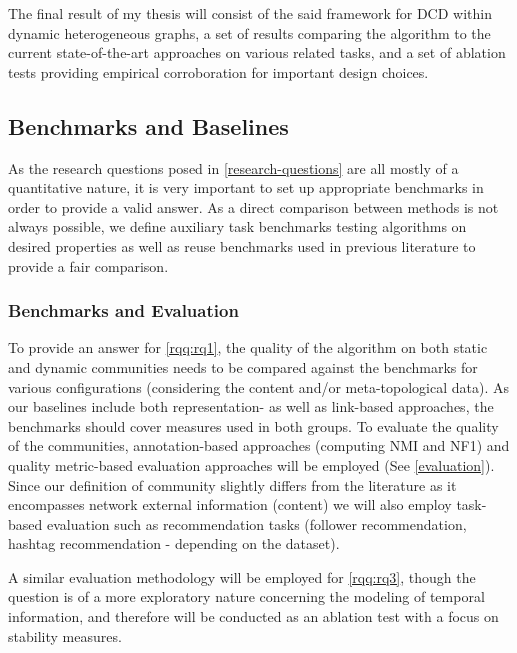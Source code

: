 \documentclass[
acmsmall,
nonacm,
screen,
acmthm]{acmart}
\begin{document}
The final result of my thesis will consist of the said framework for DCD
within dynamic heterogeneous graphs, a set of results comparing the
algorithm to the current state-of-the-art approaches on various related
tasks, and a set of ablation tests providing empirical corroboration for
important design choices.

\hypertarget{benchmarks-and-baselines}{%
\subsection{Benchmarks and Baselines}\label{benchmarks-and-baselines}}

As the research questions posed in \cref{research-questions} are all
mostly of a quantitative nature, it is very important to set up
appropriate benchmarks in order to provide a valid answer. As a direct
comparison between methods is not always possible, we define auxiliary
task benchmarks testing algorithms on desired properties as well as
reuse benchmarks used in previous literature to provide a fair
comparison.

\hypertarget{benchmarks-and-evaluation}{%
\subsubsection{Benchmarks and
Evaluation}\label{benchmarks-and-evaluation}}

To provide an answer for \cref{rqq:rq1}, the quality of the algorithm on
both static and dynamic communities needs to be compared against the
benchmarks for various configurations (considering the content and/or
meta-topological data). As our baselines include both representation- as
well as link-based approaches, the benchmarks should cover measures used
in both groups. To evaluate the quality of the communities,
annotation-based approaches (computing NMI and NF1) and quality
metric-based evaluation approaches will be employed (See
\ref{evaluation}). Since our definition of community slightly differs
from the literature as it encompasses network external information
(content) we will also employ task-based evaluation such as
recommendation tasks (follower recommendation, hashtag recommendation -
depending on the dataset).

A similar evaluation methodology will be employed for \cref{rqq:rq3},
though the question is of a more exploratory nature concerning the
modeling of temporal information, and therefore will be conducted as an
ablation test with a focus on stability measures.
\end{document}

